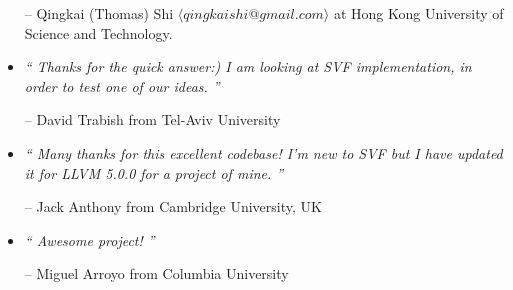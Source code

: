 \documentclass[12pt]{article}
\begin{document}
\begin{itemize}
\qquad -- Qingkai (Thomas) Shi $\langle qingkaishi@gmail.com \rangle$ at Hong Kong University of Science and Technology. 

\item
\emph{`` Thanks for the quick answer:) I am looking at SVF implementation, in order to test one of our ideas. ''}

\qquad -- David Trabish from Tel-Aviv University

\item
\emph{``
Many thanks for this excellent codebase! I'm new to SVF but I have updated it for LLVM 5.0.0 for a project of mine. ''}

\qquad -- Jack Anthony from Cambridge University, UK



\item
\emph{``
Awesome project! ''}

\qquad -- Miguel Arroyo from Columbia University


\end{itemize}
\end{document}
